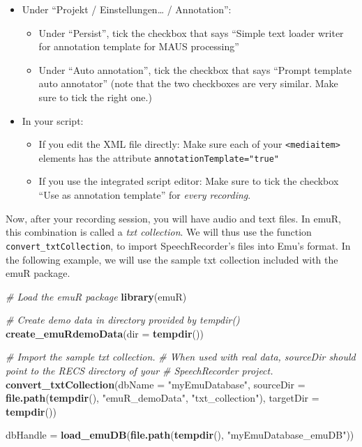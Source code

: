 \documentclass[]{book}
\newenvironment{Shaded}{\begin{snugshade}}{\end{snugshade}}
\newcommand{\KeywordTok}[1]{\textcolor[rgb]{0.13,0.29,0.53}{\textbf{{#1}}}}
\newcommand{\DataTypeTok}[1]{\textcolor[rgb]{0.13,0.29,0.53}{{#1}}}
\newcommand{\StringTok}[1]{\textcolor[rgb]{0.31,0.60,0.02}{{#1}}}
\newcommand{\CommentTok}[1]{\textcolor[rgb]{0.56,0.35,0.01}{\textit{{#1}}}}
\newcommand{\NormalTok}[1]{{#1}}
\providecommand{\tightlist}{%
  \setlength{\itemsep}{0pt}\setlength{\parskip}{0pt}}
\theoremstyle{definition}
\theoremstyle{definition}
\theoremstyle{definition}
\theoremstyle{remark}
\begin{document}
\begin{itemize}
\tightlist
\item
  Under ``Projekt / Einstellungen\ldots{} / Annotation'':

  \begin{itemize}
  \tightlist
  \item
    Under ``Persist'', tick the checkbox that says ``Simple text loader
    writer for annotation template for MAUS processing''
  \item
    Under ``Auto annotation'', tick the checkbox that says ``Prompt
    template auto annotator'' (note that the two checkboxes are very
    similar. Make sure to tick the right one.)
  \end{itemize}
\item
  In your script:

  \begin{itemize}
  \tightlist
  \item
    If you edit the XML file directly: Make sure each of your
    \texttt{\textless{}mediaitem\textgreater{}} elements has the
    attribute \texttt{annotationTemplate="true"}
  \item
    If you use the integrated script editor: Make sure to tick the
    checkbox ``Use as annotation template'' for \emph{every recording}.
  \end{itemize}
\end{itemize}

Now, after your recording session, you will have audio and text files.
In emuR, this combination is called a \emph{txt collection}. We will
thus use the function \texttt{convert\_txtCollection}, to import
SpeechRecorder's files into Emu's format. In the following example, we
will use the sample txt collection included with the emuR package.

\begin{Shaded}
\begin{Highlighting}[]
\CommentTok{# Load the emuR package}
\KeywordTok{library}\NormalTok{(emuR)}

\CommentTok{# Create demo data in directory provided by tempdir()}
\KeywordTok{create_emuRdemoData}\NormalTok{(}\DataTypeTok{dir =} \KeywordTok{tempdir}\NormalTok{())}

\CommentTok{# Import the sample txt collection.}
\CommentTok{# When used with real data, sourceDir should point to the RECS directory of your}
\CommentTok{# SpeechRecorder project.}
\KeywordTok{convert_txtCollection}\NormalTok{(}\DataTypeTok{dbName =} \StringTok{"myEmuDatabase"}\NormalTok{,}
                      \DataTypeTok{sourceDir =} \KeywordTok{file.path}\NormalTok{(}\KeywordTok{tempdir}\NormalTok{(), }\StringTok{"emuR_demoData"}\NormalTok{, }\StringTok{"txt_collection"}\NormalTok{),}
                      \DataTypeTok{targetDir =} \KeywordTok{tempdir}\NormalTok{())}

\NormalTok{dbHandle =}\StringTok{ }\KeywordTok{load_emuDB}\NormalTok{(}\KeywordTok{file.path}\NormalTok{(}\KeywordTok{tempdir}\NormalTok{(), }\StringTok{"myEmuDatabase_emuDB"}\NormalTok{))}
\end{Highlighting}
\end{Shaded}
\end{document}
